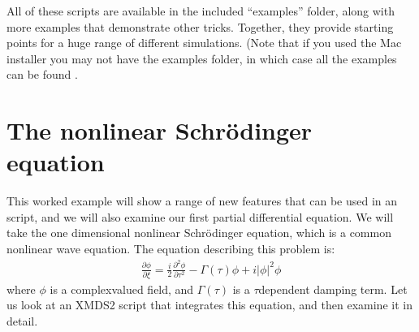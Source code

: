 \documentclass[letterpaper,10pt,english]{sphinxmanual}
\begin{document}
\sphinxAtStartPar
All of these scripts are available in the included “examples” folder, along with more examples that demonstrate other tricks.  Together, they provide starting points for a huge range of different simulations. (Note that if you used the Mac installer you may not have the examples folder, in which case all the examples can be found .

\ignorespaces 

\section{The nonlinear Schrödinger equation}
\label{\detokenize{worked_examples:the-nonlinear-schrodinger-equation}}\label{\detokenize{worked_examples:nonlinearschrodingerequation}}\label{\detokenize{worked_examples:index-1}}
\sphinxAtStartPar
This worked example will show a range of new features that can be used in an  script, and we will also examine our first partial differential equation.  We will take the one dimensional nonlinear Schrödinger equation, which is a common nonlinear wave equation.  The equation describing this problem is:
\begin{equation*}
\begin{split}\frac{\partial \phi}{\partial \xi} = \frac{i}{2}\frac{\partial^2 \phi}{\partial \tau^2} - \Gamma(\tau)\phi+i|\phi|^2 \phi\end{split}
\end{equation*}
\sphinxAtStartPar
where \(\phi\) is a complex\sphinxhyphen{}valued field, and \(\Gamma(\tau)\) is a \(\tau\)\sphinxhyphen{}dependent damping term.  Let us look at an XMDS2 script that integrates this equation, and then examine it in detail.
\end{document}
